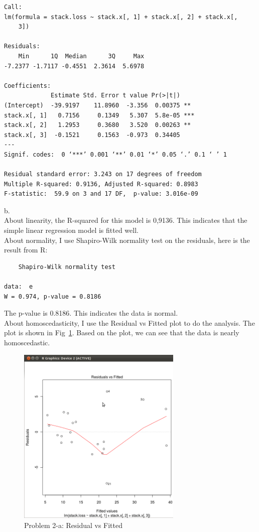 \documentclass[12pt]{article}
\begin{document}
\begin{verbatim}
Call:
lm(formula = stack.loss ~ stack.x[, 1] + stack.x[, 2] + stack.x[, 
    3])

Residuals:
    Min      1Q  Median      3Q     Max 
-7.2377 -1.7117 -0.4551  2.3614  5.6978 

Coefficients:
             Estimate Std. Error t value Pr(>|t|)    
(Intercept)  -39.9197    11.8960  -3.356  0.00375 ** 
stack.x[, 1]   0.7156     0.1349   5.307  5.8e-05 ***
stack.x[, 2]   1.2953     0.3680   3.520  0.00263 ** 
stack.x[, 3]  -0.1521     0.1563  -0.973  0.34405    
---
Signif. codes:  0 ‘***’ 0.001 ‘**’ 0.01 ‘*’ 0.05 ‘.’ 0.1 ‘ ’ 1 

Residual standard error: 3.243 on 17 degrees of freedom
Multiple R-squared: 0.9136,	Adjusted R-squared: 0.8983 
F-statistic:  59.9 on 3 and 17 DF,  p-value: 3.016e-09 
\end{verbatim}

b.\\

About linearity, the R-squared for this model is 0,9136. This
indicates that the simple linear regression model is fitted well.\\

About normality, I use Shapiro-Wilk normality test on the residuals,
here is the result from R: 

\begin{verbatim}
	Shapiro-Wilk normality test

data:  e 
W = 0.974, p-value = 0.8186
\end{verbatim}

The p-value is 0.8186. This indicates the data is normal.\\

About homoscedasticity, I use the Residual vs Fitted plot to do the
analysis. The plot is shown in Fig~\ref{fig:p2-RvsF}. Based on the
plot, we can see that the data is nearly homoscedastic. \\

\begin{figure}[ht!]
  \centering
  \includegraphics[width=0.7\textwidth]{p2-RvsF}
  \caption{Problem 2-a: Residual vs Fitted \label{fig:p2-RvsF}}
\end{figure}
\end{document}

